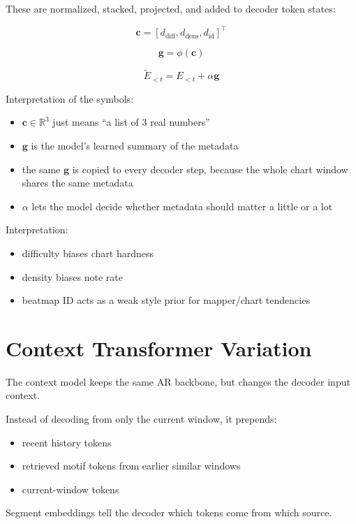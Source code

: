 \documentclass[11pt]{article}
\begin{document}
These are normalized, stacked, projected, and added to decoder token states:

\[
\mathbf{c} = [d_{\mathrm{diff}}, d_{\mathrm{dens}}, d_{\mathrm{id}}]^{\top}
\]

\[
\mathbf{g} = \phi(\mathbf{c})
\]

\[
\tilde{E}_{<t} = E_{<t} + \alpha \mathbf{g}
\]

Interpretation of the symbols:

\begin{itemize}[leftmargin=1.5em]
    \item $\mathbf{c} \in \mathbb{R}^{3}$ just means ``a list of 3 real numbers''
    \item $\mathbf{g}$ is the model's learned summary of the metadata
    \item the same $\mathbf{g}$ is copied to every decoder step, because the whole chart window shares the same metadata
    \item $\alpha$ lets the model decide whether metadata should matter a little or a lot
\end{itemize}

Interpretation:

\begin{itemize}[leftmargin=1.5em]
    \item difficulty biases chart hardness
    \item density biases note rate
    \item beatmap ID acts as a weak style prior for mapper/chart tendencies
\end{itemize}

\section*{Context Transformer Variation}

The context model keeps the same AR backbone, but changes the decoder input context.

Instead of decoding from only the current window, it prepends:

\begin{itemize}[leftmargin=1.5em]
    \item recent history tokens
    \item retrieved motif tokens from earlier similar windows
    \item current-window tokens
\end{itemize}

Segment embeddings tell the decoder which tokens come from which source.
\end{document}
